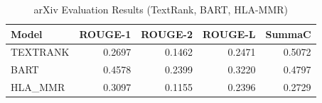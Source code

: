 \begin{table}[h]
\centering
\caption{arXiv Evaluation Results (TextRank, BART, HLA-MMR)}
\label{tab:arxiv_results}
\begin{tabular}{lrrrr}
\toprule
Model & ROUGE-1 & ROUGE-2 & ROUGE-L & SummaC \\
\midrule
TEXTRANK & 0.2697 & 0.1462 & 0.2471 & 0.5072 \\
BART & 0.4578 & 0.2399 & 0.3220 & 0.4797 \\
HLA_MMR & 0.3097 & 0.1155 & 0.2396 & 0.2729 \\
\bottomrule
\end{tabular}
\end{table}
